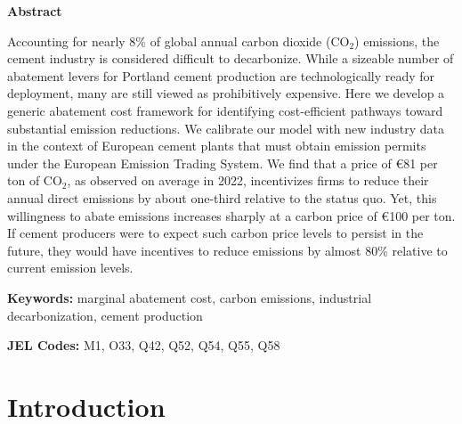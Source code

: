 \documentclass[12pt, a4paper]{article} %
\newcommand{\noin}{\noindent}
\begin{document}
\newpage
\noin \textbf{Abstract}

\noin
Accounting for nearly 8\% of global annual carbon dioxide (CO$_2$) emissions, the cement industry is considered difficult to decarbonize. While a sizeable number of abatement levers for Portland cement production are technologically ready for deployment, many are still viewed as prohibitively expensive. Here we develop a generic abatement cost framework for identifying cost-efficient pathways toward substantial emission reductions. We calibrate our model with new industry data in the context of European cement plants that must obtain emission permits under the European Emission Trading System. We find that a price of \euro 81 per ton of CO$_2$, as observed on average in 2022, incentivizes firms to reduce their annual direct emissions by about one-third relative to the status quo. Yet, this willingness to abate emissions increases sharply at a carbon price of \euro 100 per ton. If cement producers were to expect such carbon price levels to persist in the future, they would have incentives to reduce emissions by almost 80\% relative to current emission levels.

\bigskip

\noin \textbf{Keywords:} marginal abatement cost, carbon emissions, industrial decarbonization, cement production

\noin \textbf{JEL Codes:} M1, O33, Q42, Q52, Q54, Q55, Q58

\newpage
{}
\setcounter{page}{1}

\section{Introduction}
\label{sec: intro}
\end{document}
